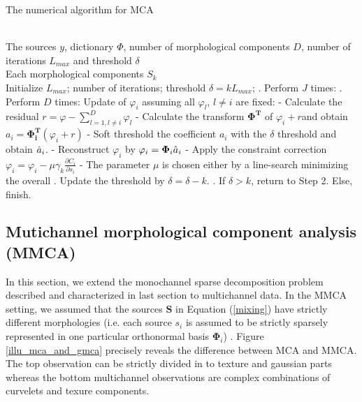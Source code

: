 \begin{algorithm}
\caption{The numerical algorithm for MCA} 
\label{algFramwork1} 
\begin{algorithmic} %
\REQUIRE ~~\\%
The sources $y$, dictionary $\Phi$, number of morphological components $D$, number of iterations $L_{max}$ and threshold $\delta$
\ENSURE ~~\\ %
Each morphological components $S_k$\\
\STATE Initialize $L_{max}$; number of iterations; threshold $ \delta= k L_{max}$;
. Perform $J$ times:
\STATE {}. Perform $D$ times:
\STATE \qquad \quad Update of $\varphi_i$ assuming all $\varphi_l$, $l \neq i$ are fixed:
\STATE \qquad \quad - Calculate the residual $r = \varphi − \sum_{l=1, l \neq i}^D \varphi_l$
\STATE \qquad \quad - Calculate the transform $\mathbf{\Phi^T}$ of $\varphi_i + r$and obtain $a_i = \mathbf{\Phi_i^T} (\varphi_i + r)$
\STATE \qquad \quad - Soft threshold the coefficient $a_i$ with the $\delta$ threshold and obtain $\Hat{a}_i$.
\STATE \qquad \quad - Reconstruct $\varphi_i$ by $\varphi_i = \mathbf{\Phi}_i \Hat{a}_i$
\STATE \qquad \quad - Apply the constraint correction $\varphi_i = \varphi_i - \mu \gamma_k \frac{\partial C_i}{\partial s_i}$
\STATE \qquad \quad - The parameter $\mu$ is chosen either by a line-search minimizing the overall 
. Update the threshold by $\delta = \delta - k$.
. If $\delta  > k$, return to Step 2. Else, finish.
\end{algorithmic}
\end{algorithm}

\subsection{Mutichannel morphological component analysis (MMCA)}
In this section, we extend the monochannel sparse decomposition problem described and characterized in last section to multichannel data. In the MMCA setting, we assumed that the sources $\mathbf{S}$ in Equation (\ref{mixing}) have strictly different morphologies (i.e. each source $s_i$ is assumed to be strictly sparsely represented in one particular orthonormal basis $\mathbf{\Phi}_i$) \cite{BobinJ_2007SaMD}. Figure \ref{illu_mca_and_gmca} precisely reveals the difference between MCA and MMCA. The top observation can be strictly divided in to texture and gaussian parts whereas the bottom multichannel observations are complex combinations of curvelets and texure components.\\


